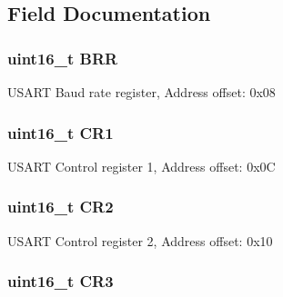 \subsection{Field Documentation}
\hypertarget{struct_u_s_a_r_t___type_def_af0ba3d82d524fddbe0fb3309788e2954}{
\subsubsection[{B\-R\-R}]{ uint16\-\_\-t B\-R\-R}}\label{struct_u_s_a_r_t___type_def_af0ba3d82d524fddbe0fb3309788e2954}
U\-S\-A\-R\-T Baud rate register, Address offset\-: 0x08 \hypertarget{struct_u_s_a_r_t___type_def_a61400ce239355b62aa25c95fcc18a5e1}{
\subsubsection[{C\-R1}]{ uint16\-\_\-t C\-R1}}\label{struct_u_s_a_r_t___type_def_a61400ce239355b62aa25c95fcc18a5e1}
U\-S\-A\-R\-T Control register 1, Address offset\-: 0x0\-C \hypertarget{struct_u_s_a_r_t___type_def_a2a3e81bd118d1bc52d24a0b0772e6a0c}{
\subsubsection[{C\-R2}]{ uint16\-\_\-t C\-R2}}\label{struct_u_s_a_r_t___type_def_a2a3e81bd118d1bc52d24a0b0772e6a0c}
U\-S\-A\-R\-T Control register 2, Address offset\-: 0x10 \hypertarget{struct_u_s_a_r_t___type_def_a9651ce2df8eec57b9cab2f27f6dbf3e1}{
\subsubsection[{C\-R3}]{ uint16\-\_\-t C\-R3}}\label{struct_u_s_a_r_t___type_def_a9651ce2df8eec57b9cab2f27f6dbf3e1}
